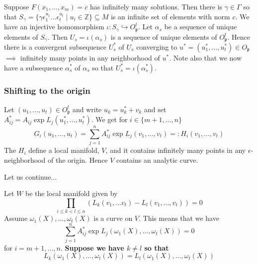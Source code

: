 \documentclass{beamer}
\newcommand{\mfrak}[1]{\mathfrak{#1}}
\newcommand{\mbb}[1]{\mathbb{#1}}
\numberwithin{equation}{section}
\begin{document}
\begin{frame}
	Suppose $F(x_1, ..., x_m) = c$ has infinitely many solutions. Then there is $\gamma \in \Gamma$ so that $S_\gamma = \{\gamma \epsilon_1^{u_1} ... \epsilon_t^{u_t} \mid u_i \in \mbb Z \} \subseteq M$ is an infinite set of elements with norm $c$. We have an injective homomorphism
	$\iota : S_\gamma \hookrightarrow O_\mfrak p^t$. Let $\alpha_s$ be a sequence of unique elements of $S_\gamma$. Then $U_s = \iota(\alpha_s)$ is a sequence of unique elements of $O_\mfrak p^t$. Hence there is a convergent subsequence $U^*_s$ of $U_s$ converging to $u^* = (u_1^*, ..., u_t^*) \in O_\mfrak p$ $\implies$ infinitely many points in any neighborhood of $u^*$. Note also that we now have a subsequence $\alpha_s^*$ of $\alpha_s$ so that $U_s^* = \iota(\alpha_s^*)$.

\end{frame}

\begin{frame}
	\frametitle{Shifting to the origin}
	Let $(u_1, ..., u_t) \in O_\mfrak p^t$ and write $u_k = u_k^* + v_k$ and set $A_{ij}^* = A_{ij} \exp L_j(u_1^*, ..., u_t^*)$. We get for $i \in \{m+1, ..., n\}$
	$$G_i(u_1, ... , u_t) = \sum_{j = 1}^n A_{ij}^* \exp L_j(v_1, ..., v_t) =: H_i(v_1, ..., v_t)$$
	The $H_i$ define a local manifold, $V$, and it contains infinitely many points in any $\epsilon$-neighborhood of the origin. Hence $V$ contains an analytic curve. 
\end{frame}

\begin{frame}
	Let us continue...
\end{frame}


\begin{frame}
	Let $W$ be the local manifold given by
	$$\prod_{i \leq k < l \leq n} (L_k(v_1, ...v_t) - L_l(v_1, ...,  v_t)) = 0$$
	\pause
	Assume $\omega_1(X), ..., \omega_t(X)$ is a curve on $V$.
	\pause
	This means that we have
	$$\sum_{j = 1}^n A_{ij}^* \exp L_j(\omega_1(X), ..., \omega_t(X)) = 0$$
	for $i = m+1, ..., n$.
	\pause
	\textbf{Suppose we have $k \neq l$ so that $$L_k(\omega_1(X), ..., \omega_t(X)) = L_l(\omega_1(X), ..., \omega_t(X))$$}
\end{frame}
\end{document}
